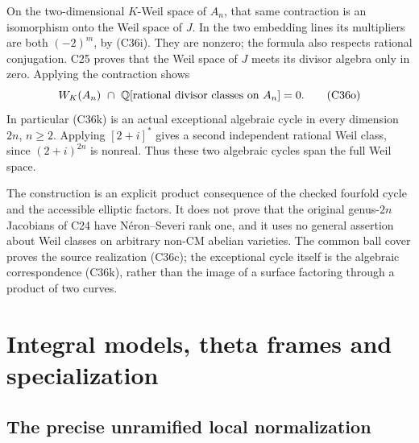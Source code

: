 \documentclass[11pt]{article}
\newcommand{\Q}{\mathbb Q}\newcommand{\C}{\mathbb C}\newcommand{\Z}{\mathbb Z}\newcommand{\R}{\mathbb R}\newcommand{\A}{\mathbb A}\newcommand{\OO}{\mathcal O}
\theoremstyle{definition}\newtheorem{definition}[theorem]{Definition}\newtheorem{remark}[theorem]{Remark}
\begin{document}
On the two-dimensional $K$-Weil space of $A_n$, that
same contraction is an isomorphism onto the Weil space
of $J$. In the two embedding lines its multipliers
are both $(-2)^m$, by (C36i). They are nonzero; the
formula also respects rational conjugation.
C25 proves that the Weil space of $J$ meets its divisor
algebra only in zero. Applying the contraction shows
\[
 W_K(A_n)\ \cap\
       \Q[\hbox{rational divisor classes on }A_n]=0.
 \tag{C36o}
\]
In particular (C36k) is an actual exceptional algebraic
cycle in every dimension $2n$, $n\ge2$.
Applying $[2+i]^*$ gives a second independent rational
Weil class, since $(2+i)^{2n}$ is nonreal. Thus these
two algebraic cycles span the full Weil space.

The construction is an explicit product consequence of
the checked fourfold cycle and the accessible elliptic
factors. It does not prove that the original genus-$2n$
Jacobians of C24 have N\'eron--Severi rank one, and it
uses no general assertion about Weil classes on arbitrary
non-CM abelian varieties. The common ball cover proves
the source realization (C36c); the exceptional cycle
itself is the algebraic correspondence (C36k), rather
than the image of a surface factoring through a product
of two curves.


\section{Integral models, theta frames and specialization}

\subsection{The precise unramified local normalization}
\end{document}
